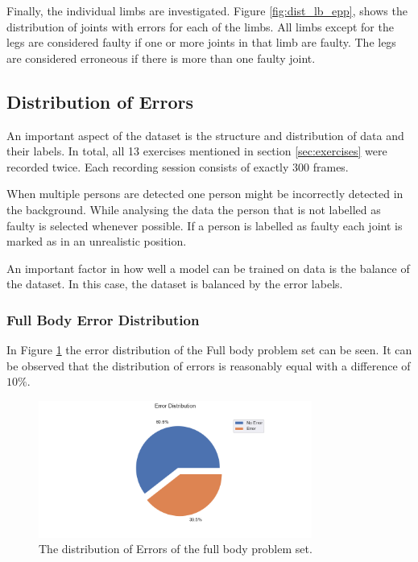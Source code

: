 Finally, the individual limbs are investigated. Figure \ref{fig:dist_lb_epp}, shows the distribution of joints with errors for each of the limbs. All limbs except for the legs are considered faulty if one or more joints in that limb are faulty. The legs are considered erroneous if there is more than one faulty joint.


\subsection{Distribution of Errors}

An important aspect of the dataset is the structure and distribution of data and their labels. In total, all 13 exercises mentioned in section \ref{sec:exercises} were recorded twice. Each recording session consists of exactly 300 frames.

When multiple persons are detected one person might be incorrectly detected in the background. While analysing the data the person that is not labelled as faulty is selected whenever possible. If a person is labelled as faulty each joint is marked as in an unrealistic position.

An important factor in how well a model can be trained on data is the balance of the dataset. In this case, the dataset is balanced by the error labels. 

\subsubsection{Full Body Error Distribution}

In Figure \ref{fig:fb_pie} the error distribution of the Full body problem set can be seen. It can be observed that the distribution of errors is reasonably equal with a difference of $10\%$. 

\begin{figure}
  \centering
  \includegraphics[width=0.8\textwidth]{figures/Data/dist_full_body/Error_Distribution_by_Body_Half.png}
  \caption[Error Distribution of the Full Body]{The distribution of Errors of the full body problem set.}
  \label{fig:fb_pie}
\end{figure}

